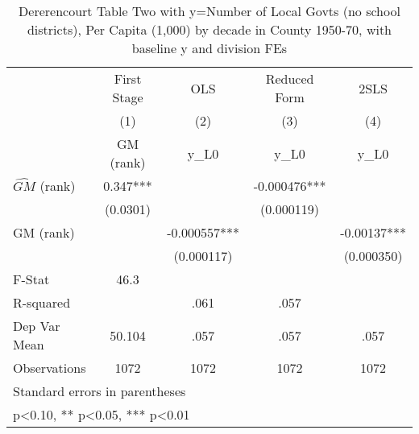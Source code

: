 \begin{table}[htbp]\centering
\def\sym#1{\ifmmode^{#1}\else\(^{#1}\)\fi}
\caption{Dererencourt Table Two with y=Number of Local Govts (no school districts), Per Capita (1,000) by decade in County 1950-70, with baseline y and division FEs}
\begin{tabular}{l*{4}{c}}
\toprule
                    & First Stage   &         OLS   &Reduced Form   &        2SLS   \\
                    &\multicolumn{1}{c}{(1)}&\multicolumn{1}{c}{(2)}&\multicolumn{1}{c}{(3)}&\multicolumn{1}{c}{(4)}\\
                    &\multicolumn{1}{c}{GM  (rank)}&\multicolumn{1}{c}{y\_L0}&\multicolumn{1}{c}{y\_L0}&\multicolumn{1}{c}{y\_L0}\\
\midrule
$\hat{GM}$ (rank)   &       0.347***&               &   -0.000476***&               \\
                    &    (0.0301)   &               &  (0.000119)   &               \\
\addlinespace
GM  (rank)          &               &   -0.000557***&               &    -0.00137***\\
                    &               &  (0.000117)   &               &  (0.000350)   \\
\midrule
F-Stat              &        46.3   &               &               &               \\
R-squared           &               &        .061   &        .057   &               \\
Dep Var Mean        &      50.104   &        .057   &        .057   &        .057   \\
Observations        &        1072   &        1072   &        1072   &        1072   \\
\bottomrule
\multicolumn{5}{l}{\footnotesize Standard errors in parentheses}\\
\multicolumn{5}{l}{\footnotesize * p<0.10, ** p<0.05, *** p<0.01}\\
\end{tabular}
\end{table}

